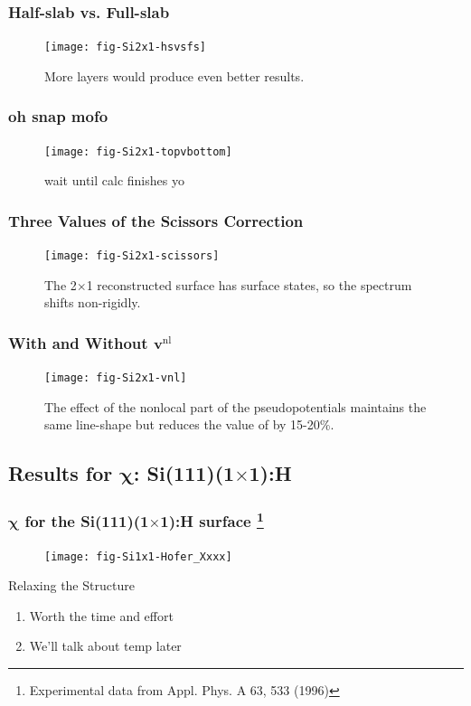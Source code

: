 \documentclass{beamer}
\begin{document}
\begin{frame}
\frametitle{Half-slab vs. Full-slab}
\begin{figure}
\centering
\texttt{[image: fig-Si2x1-hsvsfs]}
\caption{More layers would produce even better results.}
\end{figure}
\end{frame}

\begin{frame}
\frametitle{oh snap mofo}
\begin{figure}
\centering
\texttt{[image: fig-Si2x1-topvbottom]}
\caption{wait until calc finishes yo}
\end{figure}
\end{frame}

\begin{frame}
\frametitle{Three Values of the Scissors Correction}
\begin{figure}
\centering
\texttt{[image: fig-Si2x1-scissors]}
\caption{The 2$\times$1 reconstructed surface has surface states, so the
spectrum shifts non-rigidly.}
\end{figure}
\end{frame}

\begin{frame}
\frametitle{With and Without \texorpdfstring{$\mathbf{v}^{\mathrm{nl}}$}{vnl}}
\begin{figure}
\centering
\texttt{[image: fig-Si2x1-vnl]}
\caption{The effect of the nonlocal part of the pseudopotentials maintains the
same line-shape but reduces the value of by 15-20\%.}
\end{figure}
\end{frame}



\subsection{Results for \texorpdfstring{$\boldsymbol{\chi}$}{X}:
\texorpdfstring{Si(111)(1$\times$1):H}{Si(111)(1x1):H}}

\begin{frame}
\frametitle{$\boldsymbol{\chi}$ for the Si(111)(1$\times$1):H surface%
\footnote{Experimental data from Appl. Phys. A 63, 533 (1996)}}
\begin{figure}
\centering
\texttt{[image: fig-Si1x1-Hofer\_Xxxx]}
\end{figure}
\begin{block}{Relaxing the Structure}
\begin{enumerate}
\item Worth the time and effort
\item We'll talk about temp later
\end{enumerate}
\end{block}
\end{frame}
\end{document}
